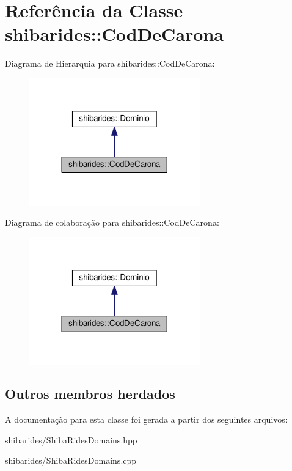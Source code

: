 \hypertarget{classshibarides_1_1CodDeCarona}{}\section{Referência da Classe shibarides\+:\+:Cod\+De\+Carona}
\label{classshibarides_1_1CodDeCarona}


Diagrama de Hierarquia para shibarides\+:\+:Cod\+De\+Carona\+:\nopagebreak
\begin{figure}[H]
\begin{center}
\leavevmode
\includegraphics[width=209pt]{classshibarides_1_1CodDeCarona__inherit__graph}
\end{center}
\end{figure}


Diagrama de colaboração para shibarides\+:\+:Cod\+De\+Carona\+:\nopagebreak
\begin{figure}[H]
\begin{center}
\leavevmode
\includegraphics[width=209pt]{classshibarides_1_1CodDeCarona__coll__graph}
\end{center}
\end{figure}
\subsection*{Outros membros herdados}


A documentação para esta classe foi gerada a partir dos seguintes arquivos\+:\begin{DoxyCompactItemize}
\item 
shibarides/Shiba\+Rides\+Domains.\+hpp\item 
shibarides/Shiba\+Rides\+Domains.\+cpp\end{DoxyCompactItemize}
